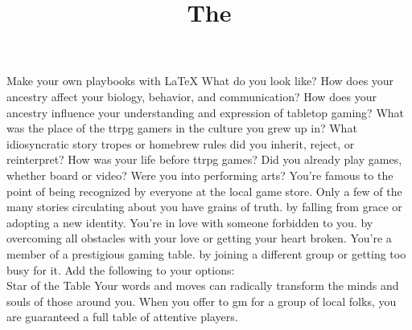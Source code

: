 \documentclass{dw2_playbook}
\title{The \playbook}
\begin{document}

\pageOne
  {
      Make your own playbooks with LaTeX
  }
  {
      What do you look like? How does your ancestry affect your biology, behavior, and communication? How does your ancestry influence your understanding and expression of tabletop gaming?
  }
  {
      What was the place of the ttrpg gamers in the culture you grew up in? What idiosyncratic story tropes or homebrew rules did you inherit, reject, or reinterpret?
  }
  {
      How was your life before ttrpg games? Did you already play games, whether board or video?  Were you into performing arts?
  }
  {
        {
          You're famous to the point of being recognized by everyone at the local game store. Only a few of the many stories circulating about you have grains of truth.  by falling from grace or adopting a new identity.
        }
        {
          You're in love with someone forbidden to you.  by overcoming all obstacles with your love or getting your heart broken.
        }
        {
          You're a member of a prestigious gaming table.  by joining a different group or getting too busy for it.
        }
      \diyDrive
  }
  {
  }
  {
        {
          Add the following to your options:\\
        }
      \takemove
          {
            Star of the Table
          }
          {
            Your words and moves can radically transform the minds and souls of those around you. When you offer to gm for a group of local folks, you are guaranteed a full table of attentive players.
          }
  }
  {
  }
\end{document}
